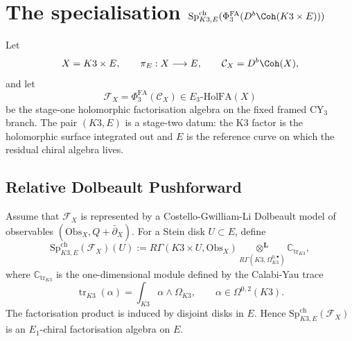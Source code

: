 
\providecommand{\kBKM}{\kappa_{\mathrm{BKM}}}
\providecommand{\kch}{\kappa_{\mathrm{ch}}}
\providecommand{\kcat}{\kappa_{\mathrm{cat}}}
\providecommand{\kfib}{\kappa_{\mathrm{fiber}}}
\providecommand{\kHeis}{\kappa_{\mathrm{ch}}^{\mathrm{Heis}}}
\providecommand{\Eone}{E_1}
\providecommand{\Etwo}{E_2}
\providecommand{\Ethree}{E_3}
\providecommand{\PhiFA}{\Phi^{\mathrm{FA}}}
\providecommand{\SpCh}{\mathrm{Sp}^{\mathrm{ch}}}
\providecommand{\ZZ}{\mathbb{Z}}
\providecommand{\QQ}{\mathbb{Q}}
\providecommand{\CC}{\mathbb{C}}
\providecommand{\cC}{\mathcal{C}}
\providecommand{\cF}{\mathcal{F}}
\providecommand{\cO}{\mathcal{O}}
\providecommand{\cM}{\mathcal{M}}
\providecommand{\cH}{\mathcal{H}}
\providecommand{\fg}{\mathfrak{g}}
\providecommand{\fh}{\mathfrak{h}}
\providecommand{\fn}{\mathfrak{n}}
\providecommand{\Muk}{\mathrm{Muk}}
\providecommand{\Obs}{\mathrm{Obs}}
\providecommand{\BPS}{\mathrm{BPS}}
\providecommand{\Uchir}{U^{\mathrm{ch}}}
\providecommand{\CoHA}{\mathrm{CoHA}}
\providecommand{\BM}{\mathrm{BM}}
\providecommand{\BorLift}{\mathrm{BorLift}}
\providecommand{\dbar}{\bar\partial}

\section{The specialisation \texorpdfstring{$\SpCh_{K3,E}(\PhiFA_3(D^b\Coh(K3\times E)))$}{Sp(K3,E) of PhiFA3}}
\label{spk3e:section}

Let
\[
 X=K3\times E,\qquad \pi_E:X\longrightarrow E,\qquad
 \cC_X=D^b\Coh(X),
\]
and let
\[
 \cF_X=\PhiFA_3(\cC_X)\in \Ethree\text{-}\mathrm{HolFA}(X)
\]
be the stage-one holomorphic factorisation algebra on the fixed framed
CY$_3$ branch. The pair \((K3,E)\) is a stage-two datum: the K3 factor
is the holomorphic surface integrated out and \(E\) is the reference
curve on which the residual chiral algebra lives.

\subsection{Relative Dolbeault Pushforward}
\label{spk3e:relative-dolbeault-pushforward}

\begin{definition}
\label{spk3e:def-specialisation}
Assume that \(\cF_X\) is represented by a Costello-Gwilliam-Li
Dolbeault model of observables \((\Obs_X,Q+\dbar_X)\). For a Stein disk
\(U\subset E\), define
\[
 \SpCh_{K3,E}(\cF_X)(U)
 :=
 R\Gamma\!\left(K3\times U,\Obs_X\right)
 \underset{R\Gamma(K3,\Omega_{K3}^{0,\bullet})}{\otimes^{\mathbf L}}
 \CC_{\operatorname{tr}_{K3}},
\]
where \(\CC_{\operatorname{tr}_{K3}}\) is the one-dimensional module
defined by the Calabi-Yau trace
\[
 \operatorname{tr}_{K3}(\alpha)
 = \int_{K3}\alpha\wedge \Omega_{K3},
 \qquad
 \alpha\in \Omega^{0,2}(K3).
\]
The factorisation product is induced by disjoint disks in \(E\). Hence
\(\SpCh_{K3,E}(\cF_X)\) is an \(\Eone\)-chiral factorisation algebra on
\(E\).
\end{definition}

